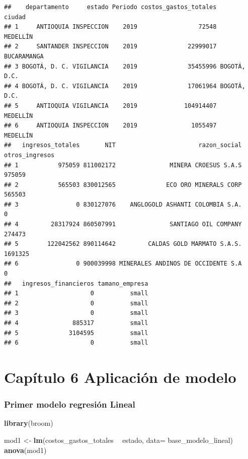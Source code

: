 \documentclass[
  11pt,
]{article}
\newenvironment{Shaded}{\begin{snugshade}}{\end{snugshade}}
\newcommand{\DataTypeTok}[1]{\textcolor[rgb]{0.13,0.29,0.53}{#1}}
\newcommand{\KeywordTok}[1]{\textcolor[rgb]{0.13,0.29,0.53}{\textbf{#1}}}
\newcommand{\NormalTok}[1]{#1}
\newcommand{\OperatorTok}[1]{\textcolor[rgb]{0.81,0.36,0.00}{\textbf{#1}}}
\newcommand{\StringTok}[1]{\textcolor[rgb]{0.31,0.60,0.02}{#1}}
\begin{document}
\begin{verbatim}
##    departamento     estado Periodo costos_gastos_totales       ciudad
## 1     ANTIOQUIA INSPECCION    2019                 72548     MEDELLÍN
## 2     SANTANDER INSPECCION    2019              22999017  BUCARAMANGA
## 3 BOGOTÁ, D. C. VIGILANCIA    2019              35455996 BOGOTÁ, D.C.
## 4 BOGOTÁ, D. C. VIGILANCIA    2019              17061964 BOGOTÁ, D.C.
## 5     ANTIOQUIA VIGILANCIA    2019             104914407     MEDELLÍN
## 6     ANTIOQUIA INSPECCION    2019               1055497     MEDELLÍN
##   ingresos_totales       NIT                       razon_social otros_ingresos
## 1           975059 811002172               MINERA CROESUS S.A.S         975059
## 2           565503 830012565              ECO ORO MINERALS CORP         565503
## 3                0 830127076    ANGLOGOLD ASHANTI COLOMBIA S.A.              0
## 4         28317924 860507991               SANTIAGO OIL COMPANY         274473
## 5        122042562 890114642         CALDAS GOLD MARMATO S.A.S.        1691325
## 6                0 900039998 MINERALES ANDINOS DE OCCIDENTE S.A              0
##   ingresos_financieros tamano_empresa
## 1                    0          small
## 2                    0          small
## 3                    0          small
## 4               885317          small
## 5              3104595          small
## 6                    0          small
\end{verbatim}

\hypertarget{capuxedtulo-6-aplicaciuxf3n-de-modelo}{%
\section{Capítulo 6 Aplicación de
modelo}\label{capuxedtulo-6-aplicaciuxf3n-de-modelo}}

\hypertarget{primer-modelo-regresiuxf3n-lineal}{%
\subsubsection{Primer modelo regresión
Lineal}\label{primer-modelo-regresiuxf3n-lineal}}

\begin{Shaded}
\begin{Highlighting}[]
\KeywordTok{library}\NormalTok{(broom)}

\NormalTok{mod1 <-}\StringTok{ }\KeywordTok{lm}\NormalTok{(costos_gastos_totales }\OperatorTok{~}\StringTok{  }\NormalTok{estado, }\DataTypeTok{data=}\NormalTok{ base_modelo_lineal) }
\KeywordTok{anova}\NormalTok{(mod1)}
\end{Highlighting}
\end{Shaded}
\end{document}
